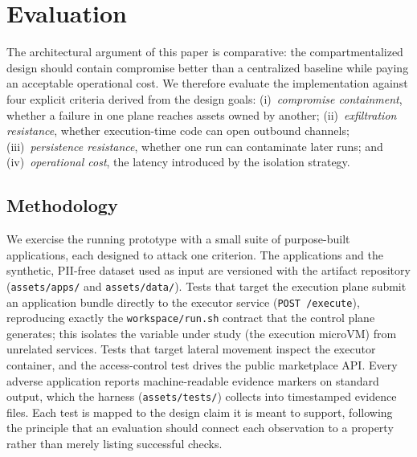 
\section{Evaluation}
\label{sec:evaluation}

The architectural argument of this paper is comparative: the compartmentalized
design should contain compromise better than a centralized baseline while paying
an acceptable operational cost. We therefore evaluate the implementation against
four explicit criteria derived from the design goals: (i)~\emph{compromise
containment}, whether a failure in one plane reaches assets owned by another;
(ii)~\emph{exfiltration resistance}, whether execution-time code can open
outbound channels; (iii)~\emph{persistence resistance}, whether one run can
contaminate later runs; and (iv)~\emph{operational cost}, the latency introduced
by the isolation strategy.

\subsection{Methodology}

We exercise the running prototype with a small suite of purpose-built
applications, each designed to attack one criterion. The applications and the
synthetic, PII-free dataset used as input are versioned with the artifact
repository (\texttt{assets/apps/} and \texttt{assets/data/}). Tests that target
the execution plane submit an application bundle directly to the executor service
(\texttt{POST /execute}), reproducing exactly the \texttt{workspace/run.sh}
contract that the control plane generates; this isolates the variable under study
(the execution microVM) from unrelated services. Tests that target lateral
movement inspect the executor container, and the access-control test drives the
public marketplace API. Every adverse application reports machine-readable
evidence markers on standard output, which the harness
(\texttt{assets/tests/}) collects into timestamped evidence files. Each test is
mapped to the design claim it is meant to support, following the principle that
an evaluation should connect each observation to a property rather than merely
listing successful checks.

